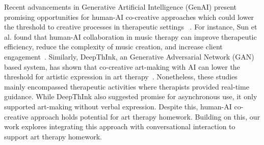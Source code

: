 


Recent advancements in Generative Artificial Intelligence (GenAI) present promising opportunities for human-AI co-creative approaches which could lower the threshold to creative processes in therapeutic settings ~\cite{sun2024understanding, wan2024metamorpheus,jutte2024perspectives, du2024deepthink,liu2024he}. For instance, Sun et al. found that human-AI collaboration in music therapy can improve therapeutic efficiency, reduce the complexity of music creation, and increase client engagement~\cite{sun2024understanding}. Similarly, DeepThInk, an Generative Adversarial Network (GAN) based system, has shown that co-creative art-making with AI can lower the threshold for artistic expression in art therapy~\cite{du2024deepthink}. 
Nonetheless, these studies mainly encompassed therapeutic activities where therapists provided real-time guidance. While DeepThInk also suggested promise for asynchronous use, it only supported art-making without verbal expression. Despite this, human-AI co-creative approach holds potential for art therapy homework. Building on this, our work explores integrating this approach with conversational interaction to support art therapy homework.

